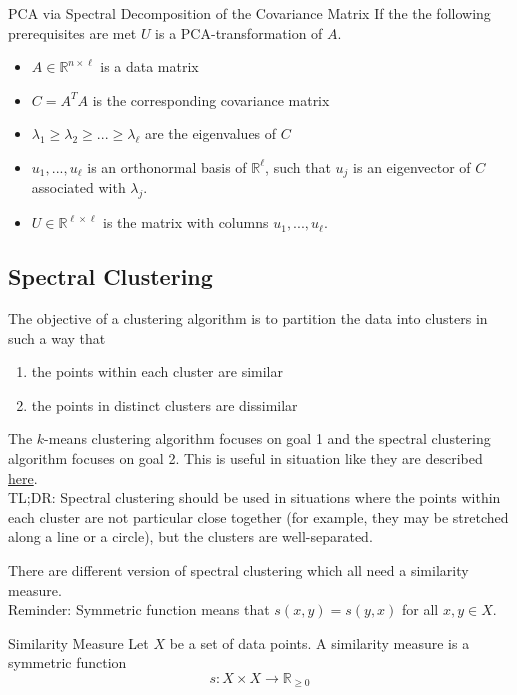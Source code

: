 \documentclass{panikzettel}
\begin{document}
\begin{theo}{PCA via Spectral Decomposition of the Covariance Matrix}
If the the following prerequisites are met $U$ is a PCA-transformation of $A$.
\begin{itemize}
\item $A\in \mathbb{R}^{n\times \ell}$ is a data matrix
\item $C=A^TA$ is the corresponding covariance matrix
\item $\lambda_1\geq \lambda_2 \geq ...\geq \lambda_\ell$ are the eigenvalues of $C$
\item $u_1,...,u_\ell$ is an orthonormal basis of $\mathbb{R}^\ell$, such that $u_j$ is an eigenvector of $C$ associated with $\lambda_j$.
\item $U\in\mathbb{R}^{\ell\times\ell}$ is the matrix with columns $u_1,...,u_\ell$.
\end{itemize}
\end{theo}

\subsection{Spectral Clustering}
The objective of a clustering algorithm is to partition the data into clusters in such a way that
\begin{enumerate}
\item the points within each cluster are similar
\item the points in distinct clusters are dissimilar
\end{enumerate}

The $k$-means clustering algorithm focuses on goal 1 and the spectral clustering algorithm focuses on goal 2. This is useful in situation like they are described \href{https://towardsdatascience.com/spectral-clustering-82d3cff3d3b7}{here}.\\
TL;DR: Spectral clustering should be used in situations where the points within each cluster are not particular close together (for example, they may be stretched along a line or a circle), but the clusters are well-separated.\\

\begin{halfboxl}
\vspace{-\baselineskip}
	There are different version of spectral clustering which all need a similarity measure.\\
	Reminder: Symmetric function means that $s(x,y)=s(y,x)$ for all $x,y\in X$.
\end{halfboxl}
\begin{halfboxr}
\vspace{-\baselineskip}
	\begin{defi}{Similarity Measure}
	Let $X$ be a set of data points. A similarity measure is a symmetric function
	\[
	s:X\times X\rightarrow\mathbb{R}_{\geq 0}
	\]
	\end{defi}
\end{halfboxr}
\end{document}
